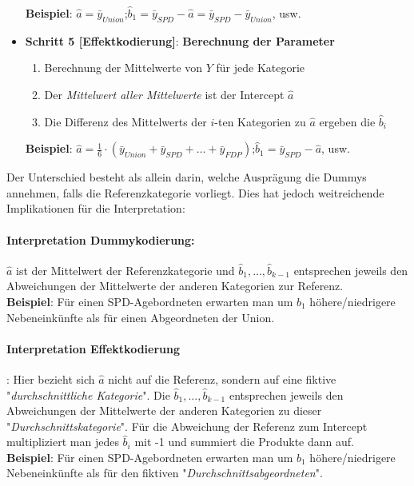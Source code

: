 \documentclass[a4paper]{article}
\begin{document}
\begin{itemize}
\begin{enumerate}
            \end{enumerate}
            \textbf{Beispiel}: $\hat a = \bar y_{Union}$;\quad $\hat b_1 = \bar y_{SPD} - \hat a = \bar y_{SPD} - \bar y_{Union}$, usw.
    \item[] \textbf{Schritt 5 [Effektkodierung]}: \textbf{Berechnung der Parameter}
            \begin{enumerate}
                \item Berechnung der Mittelwerte von $Y$ für jede Kategorie
                \item Der \textit{Mittelwert aller Mittelwerte} ist der Intercept $\hat a$
                \item Die Differenz des Mittelwerts der $i$-ten Kategorien zu $\hat a$ ergeben die $\hat b_i$
            \end{enumerate}
            \textbf{Beispiel}: $\hat a = \frac{1}{6}\cdot(\bar y_{Union} + \bar y_{SPD} + \hdots + \bar y_{FDP})$;\quad $\hat b_1 = \bar y_{SPD} - \hat a$, usw.
\end{itemize}

\noindent Der Unterschied besteht als allein darin, welche Ausprägung die Dummys annehmen, falls die Referenzkategorie vorliegt. Dies hat jedoch weitreichende Implikationen für die Interpretation:

\paragraph{Interpretation Dummykodierung:}
$\hat{a}$ ist der Mittelwert der Referenzkategorie und $\hat{b}_1, \hdots, \hat{b}_{k-1}$ entsprechen jeweils den Abweichungen der Mittelwerte der anderen Kategorien zur Referenz.\\ 
\textbf{Beispiel}: Für einen SPD-Agebordneten erwarten man um $\hat{b}_1$ höhere/niedrigere Nebeneinkünfte als für einen Abgeordneten der Union.

\paragraph{Interpretation Effektkodierung}: Hier bezieht sich $\hat a$ nicht auf die Referenz, sondern auf eine fiktive "\textit{durchschnittliche Kategorie}". Die $\hat{b}_1, \hdots, \hat{b}_{k-1}$ entsprechen jeweils den Abweichungen der Mittelwerte der anderen Kategorien zu dieser "\textit{Durchschnittskategorie}". Für die Abweichung der Referenz zum Intercept multipliziert man jedes $\hat b_i$ mit -1 und summiert die Produkte dann auf.\\ 
\textbf{Beispiel}: Für einen SPD-Agebordneten erwarten man um $\hat{b}_1$ höhere/niedrigere Nebeneinkünfte als für den fiktiven "\textit{Durchschnittsabgeordneten}".
\end{document}
